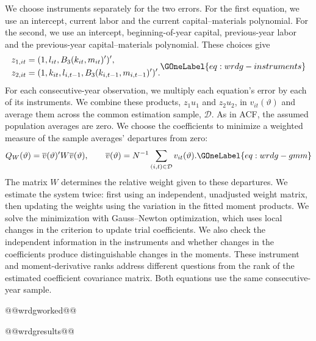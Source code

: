 We choose instruments separately for the two errors. For the first equation, we use an intercept, current labor and the current capital--materials polynomial. For the second, we use an intercept, beginning-of-year capital, previous-year labor and the previous-year capital--materials polynomial. These choices give
\begin{equation}
\begin{aligned}
z_{1,it}&=(1,l_{it},B_3(k_{it},m_{it})')',\\
z_{2,it}&=(1,k_{it},l_{i,t-1},B_3(k_{i,t-1},m_{i,t-1})')'.
\end{aligned}
\GOneLabel{eq:wrdg-instruments}
\end{equation}
For each consecutive-year observation, we multiply each equation's error by each of its instruments. We combine these products, $z_1u_1$ and $z_2u_2$, in $v_{it}(\vartheta)$ and average them across the common estimation sample, $\mathcal D$. As in ACF, the assumed population averages are zero. We choose the coefficients to minimize a weighted measure of the sample averages' departures from zero:
\begin{equation}
Q_W(\vartheta)=\overline v(\vartheta)'W\overline v(\vartheta),\qquad
\overline v(\vartheta)=N^{-1}\sum_{(i,t)\in\mathcal D}v_{it}(\vartheta).
\GOneLabel{eq:wrdg-gmm}
\end{equation}
The matrix $W$ determines the relative weight given to these departures. We estimate the system twice: first using an independent, unadjusted weight matrix, then updating the weights using the variation in the fitted moment products. We solve the minimization with Gauss--Newton optimization, which uses local changes in the criterion to update trial coefficients. We also check the independent information in the instruments and whether changes in the coefficients produce distinguishable changes in the moments. These instrument and moment-derivative ranks address different questions from the rank of the estimated coefficient covariance matrix. Both equations use the same consecutive-year sample.

@@wrdgworked@@

@@wrdgresults@@
